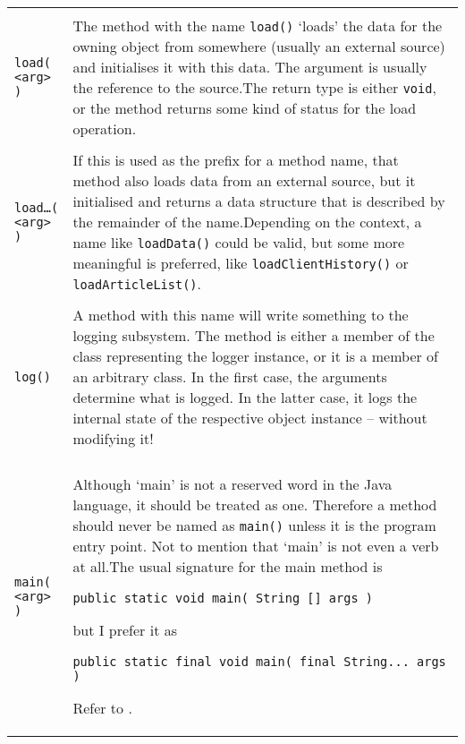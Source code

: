 \begin{longtable}{|l|X|}
    \makecell{\lstinline|load()| \\ \lstinline|load( <arg> )|} & The method with the name \lstinline|load()| ‘loads’ the data for the owning object from somewhere (usually an external source) and initialises it with this data. The argument is usually the reference to the source.\newline The return type is either \lstinline|void|, or the method returns some kind of status for the load operation.\\
    \hline

    \makecell{\lstinline|load…()| \\ \lstinline|load…( <arg> )|} & If this is used as the prefix for a method name, that method also loads data from an external source, but it initialised and returns a data structure that is described by the remainder of the name.\newline Depending on the context, a name like \lstinline|loadData()| could be valid, but some more meaningful is preferred, like \lstinline|loadClientHistory()| or \lstinline|loadArticleList()|. \\
    \hline

    \makecell{\lstinline|log( <arg> )| \\ \lstinline|log()|} & A method with this name will write something to the logging subsystem. The method is either a member of the class representing the logger instance, or it is a member of an arbitrary class. In the first case, the arguments determine what is logged. In the latter case, it logs the internal state of the respective object instance – without modifying it! \\
    \hline

    \makecell{\lstinline|main()| \\ \lstinline|main( <arg> )|} & Although ‘main’ is not a reserved word in the Java language, it should be treated as one. Therefore a method should never be named as \lstinline|main()| unless it is the program entry point. Not to mention that ‘main’ is not even a verb at all.\newline The usual signature for the main method is
\begin{lstlisting}
public static void main( String [] args )
\end{lstlisting}
but I prefer it as
\begin{lstlisting}
public static final void main( final String... args )
\end{lstlisting}
Refer to \autocite{ORACLE_DOC_LANGUAGE_SPECIFICATION:Invoke_Test.main}. \\
    \hline


\end{longtable}
